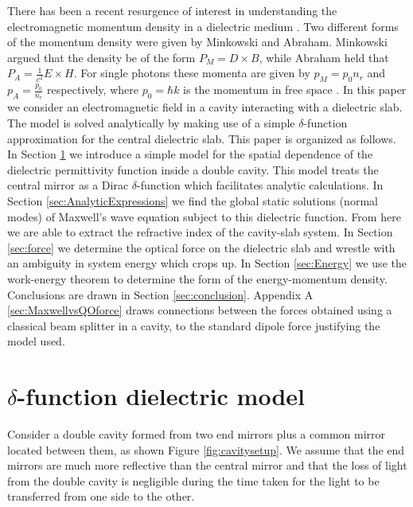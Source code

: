 \documentclass[twocolumn,english,pra,aps,superscriptaddress,floatfix]{revtex4-1}
\begin{document}
There has been a recent resurgence of interest in understanding the electromagnetic momentum density in a dielectric medium \cite{barnett,chiao,mansuripur,ketterle,feng,hinds,loudon}.  Two different forms of the momentum density were given by Minkowski and Abraham.  Minkowski argued that the density be of the form $P_M=D\times B$, while Abraham held that $P_A=\frac{1}{c^2}E\times H$.  For single photons these momenta are given by $p_M= p_{0} n_{r}$ and $p_A=\frac{p_{0}}{n_{r}}$ respectively, where $p_0=\hbar k$ is the momentum in free space . In this paper we consider an electromagnetic field in a cavity interacting with a dielectric slab. The model is solved analytically by making use of a simple $\delta$-function approximation for the central dielectric slab. 
This paper is organized as follows. In Section \ref{sec:deltafunctionmodel} we introduce a simple model for the spatial dependence of the dielectric permittivity function inside a double cavity. This model treats the central mirror as a Dirac $\delta$-function which facilitates analytic calculations. In Section \ref{sec:AnalyticExpressions} we find the global static solutions (normal modes) of Maxwell's wave equation subject to this dielectric function.  From here we are able to extract the refractive index of the cavity-slab system. In Section \ref{sec:force} we determine the optical force on the dielectric slab and wrestle with an ambiguity in system energy which crops up. In Section \ref{sec:Energy} we use the work-energy theorem to determine the form of the energy-momentum density. Conclusions are drawn in Section \ref{sec:conclusion}. Appendix A \ref{sec:MaxwellvsQOforce} draws connections between the forces obtained using a classical beam splitter in a cavity, to the standard dipole force \cite{cohentannoudji} justifying the model used. 




\section{$\delta$-function dielectric model}
\label{sec:deltafunctionmodel}



Consider a double cavity formed from two end mirrors plus a common mirror located between them, as shown Figure \ref{fig:cavitysetup}. We assume that the end mirrors are much more reflective than the central mirror and that the loss of light from the double cavity is negligible during the time taken for the light to be transferred from one side to the other. 
\end{document}
